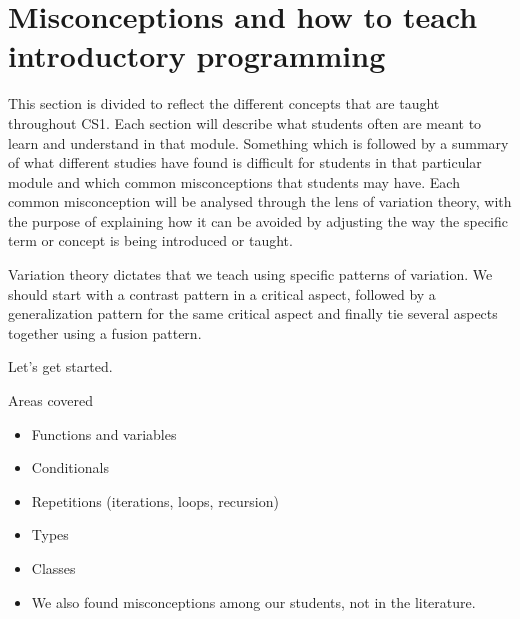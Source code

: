 \mode*
\section[Misconceptions and how to teach]
  {Misconceptions and how to teach introductory programming}
\label{misconceptions}

This section is divided to reflect the different concepts that are taught 
throughout CS1. Each section will describe what students often are meant to 
learn and understand in that module. Something which is followed by a 
summary 
of what different studies have found is difficult for students in that 
particular
module and which common misconceptions that students may have. Each common 
misconception will be analysed through the lens of variation theory, with 
the purpose of explaining how it can be avoided by adjusting the way 
the specific term or concept is being introduced or taught.

Variation theory dictates that we teach using specific patterns of variation.
We should start with a contrast pattern in a critical aspect, followed by a 
generalization pattern for the same critical aspect and finally tie several 
aspects together using a fusion pattern.

Let's get started.

\begin{frame}
  \begin{block}{Areas covered}
    \begin{itemize}
      \item \alert<3>{Functions and variables}
      \item Conditionals
      \item Repetitions (iterations, loops, recursion)
      \item Types
      \item Classes
    \end{itemize}
  \end{block}

  \pause

  \begin{remark}
    \begin{itemize}
      \item We also found misconceptions among our students, not in the 
        literature.
    \end{itemize}
  \end{remark}
\end{frame}
